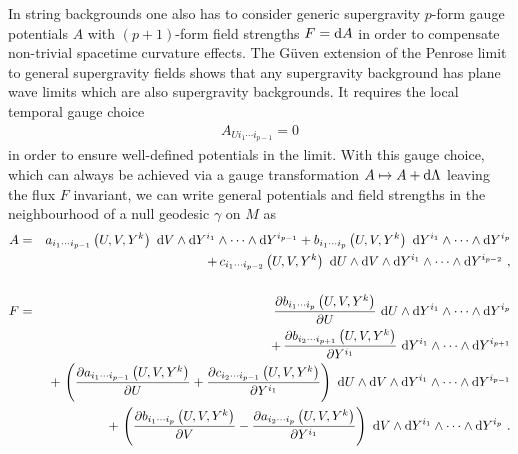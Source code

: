 \documentclass[11pt,a4paper]{article}
\def\dd{{\rm d}}
\def\nn{\nonumber}
\def\bea{\begin{eqnarray}}
\def\eea{\end{eqnarray}}
\newcommand{\beq}{\begin{eqnarray}}
\newcommand{\eeq}{\end{eqnarray}}
\begin{document}
In string backgrounds one also has to consider generic supergravity $p$-form
gauge potentials $A$ with $(p+1)$-form field strengths $F=\dd A$ in
order to compensate non-trivial spacetime curvature effects. The
G\"uven extension of the Penrose limit to general supergravity fields
shows that any supergravity background has plane wave limits which are
also supergravity backgrounds. It requires the local temporal gauge
choice
\beq
A_{Ui_1\cdots i_{p-1}}=0
\label{PGgaugechoice}\eeq
in order to ensure well-defined potentials in the limit. With this
gauge choice, which can always be achieved via a gauge transformation
$A\mapsto A+\dd\Lambda$ leaving the flux $F$ invariant, we can write
general potentials and field strengths in the neighbourhood of a null
geodesic $\gamma$ on $M$ as
\bea
A&=&a_{i_1\cdots i_{p-1}}\left(U,V,Y^k\right)~\dd V\wedge\dd
Y^{i_1}\wedge\cdots\wedge\dd Y^{i_{p-1}}+b_{i_1\cdots i_{p}}
\left(U,V,Y^k\right)~\dd Y^{i_1}\wedge\cdots\wedge\dd Y^{i_p}
\nn\\&&+\,c_{i_1\cdots i_{p-2}}\left(U,V,Y^k\right)
~\dd U\wedge\dd V\wedge\dd Y^{i_1}\wedge
\cdots\wedge\dd Y^{i_{p-2}} \ , \label{Anull}\\&&{~~~~}_{~~}^{~~}\nn\\
F&=&\frac{\partial b_{i_1\cdots i_p}\left(U,V,Y^k\right)}
{\partial U}~\dd U\wedge\dd Y^{i_1}\wedge\cdots\wedge\dd Y^{i_p}\nn\\&&+\,
\frac{\partial b_{i_2\cdots i_{p+1}}\left(U,V,Y^k\right)}
{\partial Y^{i_1}}~\dd Y^{i_1}\wedge\cdots\wedge\dd Y^{i_{p+1}}
\nn\\&&+\,\left(\frac{\partial a_{i_1\cdots i_{p-1}}
\left(U,V,Y^k\right)}{\partial U}+\frac{\partial c_{i_2\cdots
  i_{p-1}}\left(U,V,Y^k\right)}{\partial Y^{i_1}}\right)~
\dd U\wedge\dd V\wedge\dd Y^{i_1}\wedge\cdots\wedge\dd Y^{i_{p-1}}
\nn\\&&+\,\left(\frac{\partial b_{i_1\cdots i_p}
\left(U,V,Y^k\right)}{\partial V}-\frac{\partial a_{i_2\cdots
  i_p}\left(U,V,Y^k\right)}{\partial Y^{i_1}}\right)~
\dd V\wedge\dd Y^{i_1}\wedge\cdots\wedge\dd Y^{i_p} \ .
\label{Fnull}\eea
\end{document}
